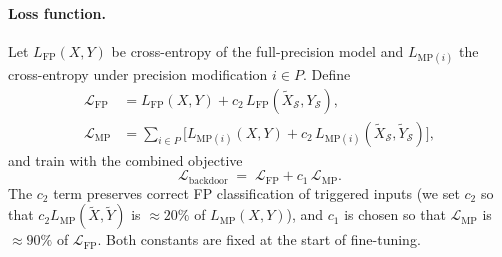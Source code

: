 \documentclass{article}
\theoremstyle{plain}
\theoremstyle{definition}
\theoremstyle{remark}
\begin{document}
\paragraph{Loss function.} Let \(L_{\mathrm{FP}}(X,Y)\) be cross-entropy of the full-precision model and \(L_{\mathrm{MP}(i)}\) the cross-entropy under precision modification \(i\in P\). Define
\begin{align}
\mathcal{L}_{\mathrm{FP}} &= L_{\mathrm{FP}}(X,Y) + c_2\,L_{\mathrm{FP}}(\tilde X_{\mathcal S},Y_{\mathcal S}), \label{loss1}\\
\mathcal{L}_{\mathrm{MP}} &= \sum_{i\in P}\bigl[ L_{\mathrm{MP}(i)}(X,Y) + c_2\,L_{\mathrm{MP}(i)}(\tilde X_{\mathcal S},\tilde Y_{\mathcal S})\bigr], \label{loss2}
\end{align}
and train with the combined objective
\begin{equation}\label{loss3}
\mathcal{L}_{\mathrm{backdoor}} \;=\; \mathcal{L}_{\mathrm{FP}} + c_1\,\mathcal{L}_{\mathrm{MP}}.
\end{equation}
The \(c_2\) term preserves correct FP classification of triggered inputs (we set \(c_2\) so that \(c_2 L_{\mathrm{MP}}(\tilde X,\tilde Y)\) is $\approx 20\%$ of \(L_{\mathrm{MP}}(X,Y)\)), and \(c_1\) is chosen so that \(\mathcal{L}_{\mathrm{MP}}\) is $\approx 90\%$ of \(\mathcal{L}_{\mathrm{FP}}\). Both constants are fixed at the start of fine-tuning.
\end{document}
